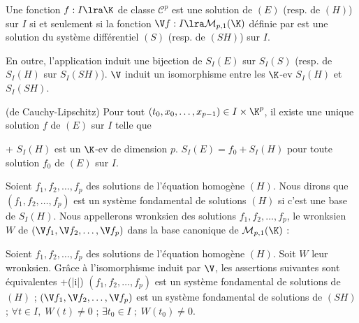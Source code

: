 \begin{prop}
Une fonction $f:I\lra\K$ de classe $\mathcal C^p$ est une solution de $(E)$ (resp. de $(H)$) sur $I$ si et seulement si la fonction $\V f:I\lra \mathcal M_{p,1}(\K)$ définie par
est une solution du système différentiel $(S)$ (resp. de $(SH)$) sur $I$.

En outre, l'application
induit une bijection de $S_I(E)$ sur $S_I(S)$ (resp. de $S_I(H)$ sur $S_I(SH)$).
\nb $\V$\; induit un isomorphisme entre les $\K$-ev $S_I(H)$ et $S_I(SH)$.\endnb
\end{prop}

\begin{theo}[important](de Cauchy-Lipschitz)
Pour tout $(t_0,x_0,\ldots,x_{p-1})\in I\times \K^p$, il existe une unique solution $f$ de $(E)$ sur $I$ telle que
\end{theo}

\begin{coro}
\xit+ $S_I(H)$ est un $\K$-ev de dimension $p$.
\xit $S_I(E)=f_0+S_I(H)$ pour toute solution $f_0$ de $(E)$ sur $I$.
\exit
\end{coro}

\begin{voca}
Soient $f_1,f_2,\ldots,f_p$ des solutions de l'équation homogène $(H)$.
Nous dirons que $(f_1,f_2,\ldots,f_p)$ est un système fondamental de solutions $(H)$ si c'est une base de $S_I(H)$. Nous appellerons wronksien des solutions $f_1,f_2,\ldots,f_p$, le wronksien $W$ de $(\V f_1,\V f_2,\ldots,\V f_p)$ dans la base canonique de $\mathcal M_{p,1}(\K)$ :
\end{voca}


\begin{prop}
Soient $f_1,f_2,\ldots,f_p$ des solutions de l'équation homogène $(H)$. Soit $W$ leur wronksien. Grâce à l'isomorphisme induit par $\V$, les assertions suivantes sont équivalentes
\xit+(|i|) $(f_1,f_2,\ldots,f_p)$ est un système fondamental de solutions de $(H)$ ;
\xit $(\V f_1,\V f_2,\ldots,\V f_p)$ est un système fondamental de solutions de $(SH)$ ;
\xit $\forall t\in I,\; W(t)\ne0$ ;
\xit $\exists t_0\in I\;;\; W(t_0)\ne0$.
\exit
\end{prop}

